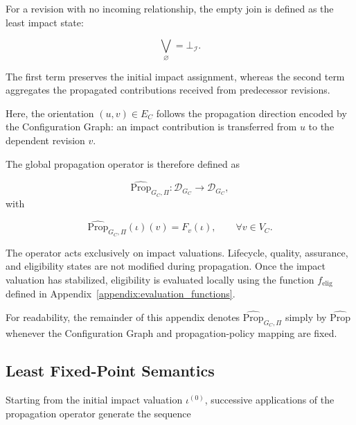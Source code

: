 \documentclass[10pt]{article}
\begin{document}
For a revision with no incoming relationship, the empty join is defined as the least impact state:

\begin{equation}
	\bigvee_{\varnothing}
	=
	\bot_{\mathcal I}.
	\label{eq:empty_impact_join}
\end{equation}

The first term preserves the initial impact assignment, whereas the second term
aggregates the propagated contributions received from predecessor revisions.

Here, the orientation $(u,v)\in E_C$ follows the propagation direction encoded
by the Configuration Graph: an impact contribution is transferred from $u$ to
the dependent revision $v$.


The global propagation operator is therefore defined as

\begin{equation}
	\label{eq:impact_operator}
	\widehat{\mathrm{Prop}}_{G_C,\Pi}
	:
	\mathcal D_{G_C}
	\rightarrow
	\mathcal D_{G_C},
\end{equation}
with

\begin{equation}
	\label{eq:impact_operator_definition}
	\widehat{\mathrm{Prop}}_{G_C,\Pi}(\iota)(v)
	=
	F_v(\iota),
	\qquad
	\forall v\in V_C.
\end{equation}

The operator acts exclusively on impact valuations.
Lifecycle, quality, assurance, and eligibility states are not modified during propagation. Once the impact valuation has stabilized, eligibility is evaluated locally using the function
$f_{\mathrm{elig}}$ defined in Appendix~\ref{appendix:evaluation_functions}.

For readability, the remainder of this appendix denotes
$\widehat{\mathrm{Prop}}_{G_C,\Pi}$ simply by $\widehat{\mathrm{Prop}}$ whenever the Configuration Graph and
propagation-policy mapping are fixed.

\subsection{Least Fixed-Point Semantics}

Starting from the initial impact valuation $\iota^{(0)}$, successive applications of the propagation operator generate the sequence
\end{document}
